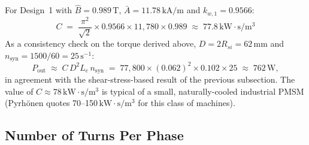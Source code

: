 \documentclass[12pt,a4paper]{article}
\newcommand{\unit}[1]{\ensuremath{\,\mathrm{#1}}}
\begin{document}
For Design~1 with $\hat{B} = 0.989\unit{T}$, $\bar A = 11.78\unit{kA/m}$
and $k_{w,1} = 0.9566$:
\begin{equation}
  C \;=\; \frac{\pi^2}{\sqrt{2}} \times 0.9566 \times 11{,}780 \times 0.989
       \;\approx\; \mathbf{77.8\unit{kW\!\cdot\!s/m^3}}
\end{equation}
As a consistency check on the torque derived above,
$D = 2R_{si} = 62\unit{mm}$ and $n_{\text{syn}} = 1500/60 = 25\unit{s^{-1}}$:
\begin{equation}
  P_{\text{out}}
    \;\approx\; C\,D^2 L_e\,n_{\text{syn}}
    \;=\; 77{,}800 \times (0.062)^2 \times 0.102 \times 25
    \;\approx\; 762\unit{W},
\end{equation}
in agreement with the shear-stress-based result of the previous
subsection. The value of $C \approx 78\unit{kW\!\cdot\!s/m^3}$ is
typical of a small, naturally-cooled industrial PMSM (Pyrh\"onen
quotes 70--150\unit{kW\!\cdot\!s/m^3} for this class of machines).

\subsection{Number of Turns Per Phase}
\label{sec:turns}
\end{document}
